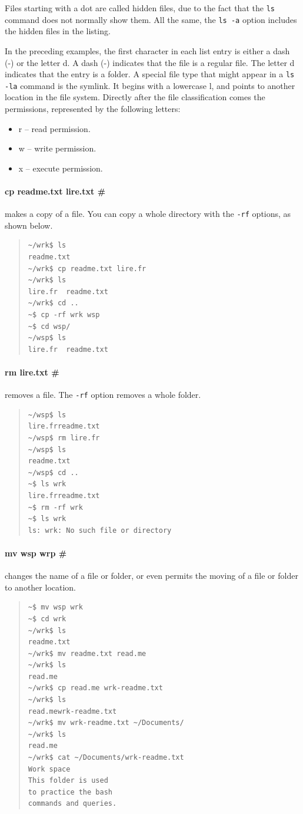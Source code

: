 \documentclass[a4paper,12pt]{book}
\begin{document}
Files starting with a dot are called hidden files,
due to the fact that the \verb|ls| command does not
normally show them. All the same,
the \verb|ls -a| option includes the
hidden files in the listing.

In the preceding examples, the first character
in each list entry is either a dash (-) or the letter d.
A dash (-) indicates that the file is a regular file.
The letter d indicates that the entry is a folder.
A special file type that might appear in a
\verb|ls -la| command is the symlink. It begins
with a lowercase l, and points to another location
in the file system.
Directly after the file classification comes the permissions,
represented by the following letters:
\begin{itemize}
\item r -- read permission.
\item w -- write permission.
\item x -- execute permission.
\end{itemize}

\paragraph{cp readme.txt lire.txt \#} makes a copy
of a file. You can copy a whole directory
with the \verb|-rf| options, as shown below.
\begin{quote}
\begin{verbatim}
~/wrk$ ls
readme.txt
~/wrk$ cp readme.txt lire.fr
~/wrk$ ls
lire.fr  readme.txt
~/wrk$ cd ..
~$ cp -rf wrk wsp
~$ cd wsp/
~/wsp$ ls
lire.fr  readme.txt
\end{verbatim}
\end{quote}

\paragraph{rm lire.txt \#} removes a file.
The \verb|-rf| option 
removes a whole folder.
\begin{quote}
\begin{verbatim}
~/wsp$ ls
lire.frreadme.txt
~/wsp$ rm lire.fr
~/wsp$ ls
readme.txt
~/wsp$ cd ..
~$ ls wrk
lire.frreadme.txt
~$ rm -rf wrk
~$ ls wrk
ls: wrk: No such file or directory
\end{verbatim}
\end{quote}

\paragraph{mv wsp wrp \#} changes
the name of a file or folder, or
even permits the moving of a file or
folder to another location.
\begin{quote}
\begin{verbatim}
~$ mv wsp wrk
~$ cd wrk
~/wrk$ ls
readme.txt
~/wrk$ mv readme.txt read.me
~/wrk$ ls
read.me
~/wrk$ cp read.me wrk-readme.txt
~/wrk$ ls
read.mewrk-readme.txt
~/wrk$ mv wrk-readme.txt ~/Documents/
~/wrk$ ls
read.me
~/wrk$ cat ~/Documents/wrk-readme.txt
Work space
This folder is used
to practice the bash
commands and queries.
\end{verbatim}
\end{quote}
\end{document}
